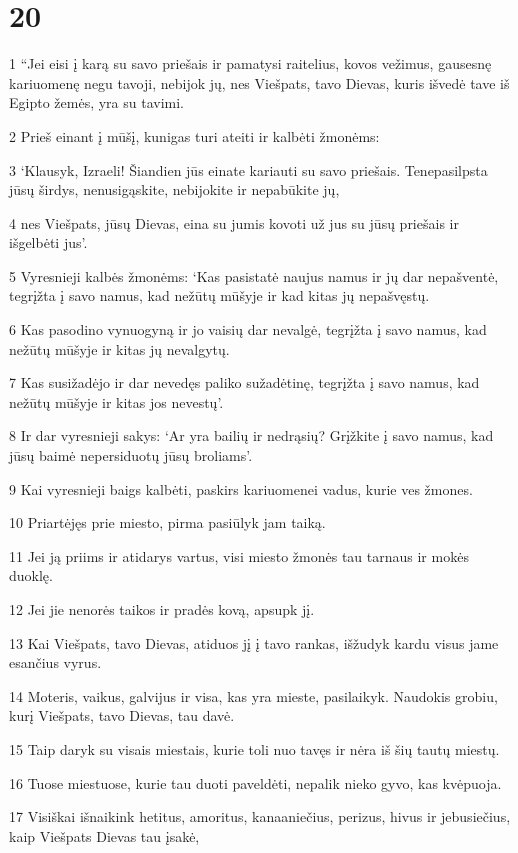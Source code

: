\chapter{20}

\par 1 “Jei eisi į karą su savo priešais ir pamatysi raitelius, kovos vežimus, gausesnę kariuomenę negu tavoji, nebijok jų, nes Viešpats, tavo Dievas, kuris išvedė tave iš Egipto žemės, yra su tavimi. 
\par 2 Prieš einant į mūšį, kunigas turi ateiti ir kalbėti žmonėms: 
\par 3 ‘Klausyk, Izraeli! Šiandien jūs einate kariauti su savo priešais. Tenepasilpsta jūsų širdys, nenusigąskite, nebijokite ir nepabūkite jų, 
\par 4 nes Viešpats, jūsų Dievas, eina su jumis kovoti už jus su jūsų priešais ir išgelbėti jus’. 
\par 5 Vyresnieji kalbės žmonėms: ‘Kas pasistatė naujus namus ir jų dar nepašventė, tegrįžta į savo namus, kad nežūtų mūšyje ir kad kitas jų nepašvęstų. 
\par 6 Kas pasodino vynuogyną ir jo vaisių dar nevalgė, tegrįžta į savo namus, kad nežūtų mūšyje ir kitas jų nevalgytų. 
\par 7 Kas susižadėjo ir dar nevedęs paliko sužadėtinę, tegrįžta į savo namus, kad nežūtų mūšyje ir kitas jos nevestų’. 
\par 8 Ir dar vyresnieji sakys: ‘Ar yra bailių ir nedrąsių? Grįžkite į savo namus, kad jūsų baimė nepersiduotų jūsų broliams’. 
\par 9 Kai vyresnieji baigs kalbėti, paskirs kariuomenei vadus, kurie ves žmones. 
\par 10 Priartėjęs prie miesto, pirma pasiūlyk jam taiką. 
\par 11 Jei ją priims ir atidarys vartus, visi miesto žmonės tau tarnaus ir mokės duoklę. 
\par 12 Jei jie nenorės taikos ir pradės kovą, apsupk jį. 
\par 13 Kai Viešpats, tavo Dievas, atiduos jį į tavo rankas, išžudyk kardu visus jame esančius vyrus. 
\par 14 Moteris, vaikus, galvijus ir visa, kas yra mieste, pasilaikyk. Naudokis grobiu, kurį Viešpats, tavo Dievas, tau davė. 
\par 15 Taip daryk su visais miestais, kurie toli nuo tavęs ir nėra iš šių tautų miestų. 
\par 16 Tuose miestuose, kurie tau duoti paveldėti, nepalik nieko gyvo, kas kvėpuoja. 
\par 17 Visiškai išnaikink hetitus, amoritus, kanaaniečius, perizus, hivus ir jebusiečius, kaip Viešpats Dievas tau įsakė, 
